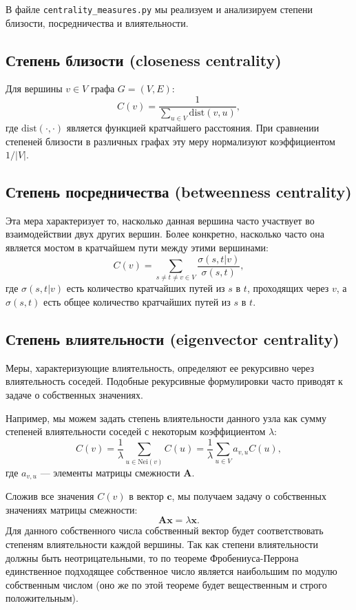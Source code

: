 \documentclass[a4paper,12pt]{article}
\begin{document}
В файле \texttt{centrality\_measures.py} мы реализуем и анализируем степени близости, посредничества и влиятельности.

\subsection{Степень близости (closeness centrality)} %

Для вершины \( v \in V \) графа \( G = (V, E) \):
\[
C(v) = \frac{1}{\sum_{u \in V} \text{dist}(v, u)},
\]
где \( \text{dist}(\cdot, \cdot) \) является функцией кратчайшего расстояния. При сравнении степеней близости в различных графах эту меру нормализуют коэффициентом \( 1/|V| \).

\subsection{Степень посредничества (betweenness centrality)}

Эта мера характеризует то, насколько данная вершина часто участвует во взаимодействии двух других вершин. Более конкретно, насколько часто она является мостом в кратчайшем пути между этими вершинами:
\[
C(v) = \sum_{s \neq t \neq v \in V} \frac{\sigma(s, t | v)}{\sigma(s, t)},
\]
где \( \sigma(s, t | v) \) есть количество кратчайших путей из \( s \) в \( t \), проходящих через \( v \), а \( \sigma(s, t) \) есть общее количество кратчайших путей из \( s \) в \( t \).

\subsection{Степень влиятельности (eigenvector centrality)}

Меры, характеризующие влиятельность, определяют ее рекурсивно через влиятельность соседей. Подобные рекурсивные формулировки часто приводят к задаче о собственных значениях.

Например, мы можем задать степень влиятельности данного узла как сумму степеней влиятельности соседей с некоторым коэффициентом \( \lambda \):
\[
C(v) = \frac{1}{\lambda} \sum_{u \in \text{Nei}(v)} C(u) = \frac{1}{\lambda} \sum_{u \in V} a_{v, u} C(u),
\]
где \( a_{v, u} \) --- элементы матрицы смежности \( \boldsymbol{A} \).

Сложив все значения \( C(v) \) в вектор \( \boldsymbol{c} \), мы получаем задачу о собственных значениях матрицы смежности:
\[
\boldsymbol{A} \boldsymbol{x} = \lambda \boldsymbol{x}.
\]
Для данного собственного числа собственный вектор будет соответствовать степеням влиятельности каждой вершины. Так как степени влиятельности должны быть неотрицательными, то по теореме Фробениуса-Перрона единственное подходящее собственное число является наибольшим по модулю собственным числом (оно же по этой теореме будет вещественным и строго положительным).
\end{document}
